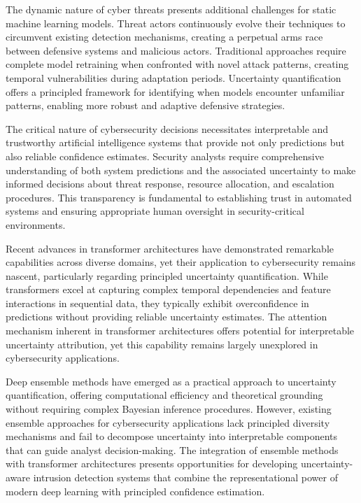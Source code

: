 \documentclass[journal]{IEEEtran}
\begin{document}
The dynamic nature of cyber threats presents additional challenges for static machine learning models. Threat actors continuously evolve their techniques to circumvent existing detection mechanisms, creating a perpetual arms race between defensive systems and malicious actors. Traditional approaches require complete model retraining when confronted with novel attack patterns, creating temporal vulnerabilities during adaptation periods. Uncertainty quantification offers a principled framework for identifying when models encounter unfamiliar patterns, enabling more robust and adaptive defensive strategies.

The critical nature of cybersecurity decisions necessitates interpretable and trustworthy artificial intelligence systems that provide not only predictions but also reliable confidence estimates. Security analysts require comprehensive understanding of both system predictions and the associated uncertainty to make informed decisions about threat response, resource allocation, and escalation procedures. This transparency is fundamental to establishing trust in automated systems and ensuring appropriate human oversight in security-critical environments.

Recent advances in transformer architectures have demonstrated remarkable capabilities across diverse domains, yet their application to cybersecurity remains nascent, particularly regarding principled uncertainty quantification. While transformers excel at capturing complex temporal dependencies and feature interactions in sequential data, they typically exhibit overconfidence in predictions without providing reliable uncertainty estimates. The attention mechanism inherent in transformer architectures offers potential for interpretable uncertainty attribution, yet this capability remains largely unexplored in cybersecurity applications.

Deep ensemble methods have emerged as a practical approach to uncertainty quantification, offering computational efficiency and theoretical grounding without requiring complex Bayesian inference procedures. However, existing ensemble approaches for cybersecurity applications lack principled diversity mechanisms and fail to decompose uncertainty into interpretable components that can guide analyst decision-making. The integration of ensemble methods with transformer architectures presents opportunities for developing uncertainty-aware intrusion detection systems that combine the representational power of modern deep learning with principled confidence estimation.
\end{document}
